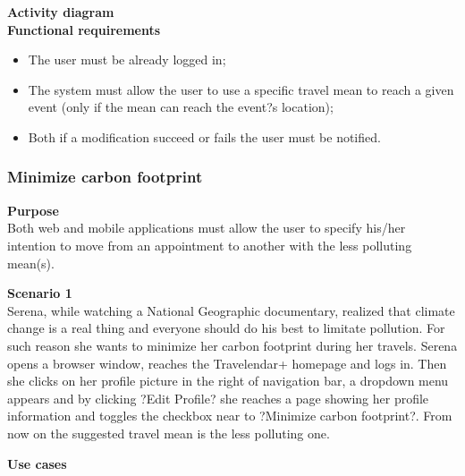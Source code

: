 \documentclass{article}
\begin{document}
	\bigskip
	\noindent
	\textbf{Activity diagram} \\
	
	
	\bigskip
	\noindent
	\textbf{Functional requirements} \\
	\begin{itemize}
		\item The user must be already logged in;
		\item The system must allow the user to use a specific travel mean to reach a given event (only if the mean can reach the event?s location);
		\item Both if a modification succeed or fails the user must be notified.
	\end{itemize}


	\subsubsection{Minimize carbon footprint}
	
	\bigskip
	\noindent
	\textbf{Purpose} \\
	Both web and mobile applications must allow the user to specify his/her intention to move from an appointment to another with the less polluting mean(s).
	
	\bigskip
	\noindent
	\textbf{Scenario 1} \\
	Serena, while watching a National Geographic documentary, realized that climate change is a real thing and everyone should do his best to limitate pollution. For such reason she wants to minimize her carbon footprint during her travels. Serena opens a browser window, reaches the Travelendar+ homepage and logs in. Then she clicks on her profile picture in the right of navigation bar, a dropdown menu appears and by clicking ?Edit Profile? she reaches a page showing her profile information and toggles the checkbox near to ?Minimize carbon footprint?. From now on the suggested travel mean is the less polluting one.
	
	\bigskip
	\noindent
	\textbf{Use cases} \\
	
\end{document}
